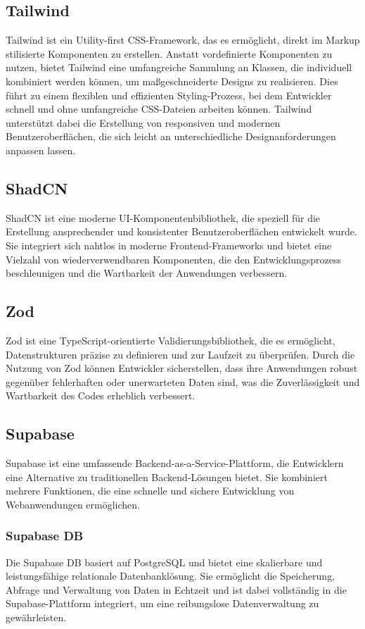 \begin{inhalt}
\subsection{Tailwind}
Tailwind ist ein Utility-first CSS-Framework, das es ermöglicht, direkt im Markup stilisierte Komponenten zu erstellen. Anstatt vordefinierte Komponenten zu nutzen, bietet Tailwind eine umfangreiche Sammlung an Klassen, die individuell kombiniert werden können, um maßgeschneiderte Designs zu realisieren. Dies führt zu einem flexiblen und effizienten Styling-Prozess, bei dem Entwickler schnell und ohne umfangreiche CSS-Dateien arbeiten können. Tailwind unterstützt dabei die Erstellung von responsiven und modernen Benutzeroberflächen, die sich leicht an unterschiedliche Designanforderungen anpassen lassen.

\subsection{ShadCN}
ShadCN ist eine moderne UI-Komponentenbibliothek, die speziell für die Erstellung ansprechender und konsistenter Benutzeroberflächen entwickelt wurde. Sie integriert sich nahtlos in moderne Frontend-Frameworks und bietet eine Vielzahl von wiederverwendbaren Komponenten, die den Entwicklungsprozess beschleunigen und die Wartbarkeit der Anwendungen verbessern.

\subsection{Zod}
\label{subsec:Zod}
Zod ist eine TypeScript-orientierte Validierungsbibliothek, die es ermöglicht, Datenstrukturen präzise zu definieren und zur Laufzeit zu überprüfen. Durch die Nutzung von Zod können Entwickler sicherstellen, dass ihre Anwendungen robust gegenüber fehlerhaften oder unerwarteten Daten sind, was die Zuverlässigkeit und Wartbarkeit des Codes erheblich verbessert.

\subsection{Supabase}
Supabase ist eine umfassende Backend-as-a-Service-Plattform, die Entwicklern eine Alternative zu traditionellen Backend-Lösungen bietet. Sie kombiniert mehrere Funktionen, die eine schnelle und sichere Entwicklung von Webanwendungen ermöglichen.

\subsubsection{Supabase DB}
Die Supabase DB basiert auf PostgreSQL und bietet eine skalierbare und leistungsfähige relationale Datenbanklösung. Sie ermöglicht die Speicherung, Abfrage und Verwaltung von Daten in Echtzeit und ist dabei vollständig in die Supabase-Plattform integriert, um eine reibungslose Datenverwaltung zu gewährleisten.


\end{inhalt}
